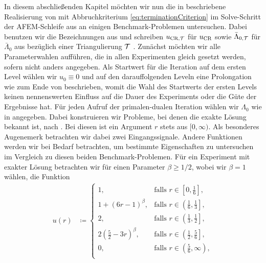\newcommand{\precDTL}{5} %
In diesem abschließenden Kapitel möchten wir nun die in
 beschriebene Realisierung von
 mit Abbruchkriterium
\eqref{eq:terminationCriterion} im Solve-Schritt der AFEM-Schleife aus
 an einigen Benchmark-Problemen untersuchen.
Dabei benutzen wir die Bezeichnungen aus  und
schreiben $u_{\textup{CR}, \mathcal{T}}$ für $u_\textup{CR}$ sowie $\bar\Lambda_{0,\mathcal{T}}$ für $\bar\Lambda_0$
aus  bezüglich einer Triangulierung $\mathcal{T}$ .
Zunächst möchten wir alle Parameterwahlen aufführen, die in allen 
Experimenten gleich gesetzt werden, sofern nicht anders angegeben.
Als Startwert für die Iteration auf dem ersten Level wählen wir
$u_0\equiv 0$ und auf den darauffolgenden Leveln eine Prolongation wie zum
Ende von  beschrieben, womit die Wahl des Startwerts
der ersten Levels keinen nennenswerten Einfluss auf die Dauer des Experiments
oder die Güte der Ergebnisse hat. 
Für jeden Aufruf der primalen-dualen Iteration wählen wir $\Lambda_0$ wie in
 angegeben.
Dabei konstruieren wir Probleme, bei denen die exakte Lösung bekannt ist,
nach . 
Bei diesen ist ein Argument $r$ stets aus $[0,\infty)$.
Als besonderes Augenemerk betrachten wir dabei zwei Eingangssignale.
Andere Funktionen werden wir bei Bedarf betrachten, um bestimmte Eigenschaften
zu untersuchen im Vergleich zu diesen beiden Benchmark-Problemen.
Für ein Experiment mit exakter Lösung betrachten wir für einen Parameter
$\beta\geq 1/2$, wobei wir $\beta =1$ wählen, die Funktion
\begin{align*}
  u(r)&\coloneqq
  \begin{cases}
    1, 
    & \text{falls } r\in \left[0,\frac{1}{6}\right],\\
    1+(6r-1)^\beta, 
    & \text{falls } r\in \left(\frac{1}{6}, \frac{1}{3}\right],\\
    2, 
    & \text{falls } r\in \left(\frac{1}{3}, \frac{1}{2}\right],\\
    2\left(\frac{5}{2}-3r\right)^\beta, 
    & \text{falls } r\in \left(\frac{1}{2}, \frac{5}{6}\right],\\
    0, 
    & \text{falls } r\in \left(\frac{5}{6}, \infty\right),\\
  \end{cases}
\end{align*}
